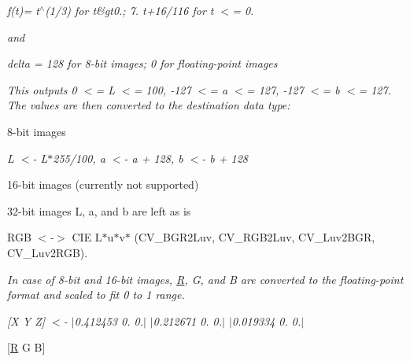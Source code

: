 {\itshape }

{\itshape {\itshape f(t)= t$^\wedge$(1/3) for t\&gt0.; 7. t+16/116 for t $<$= 0.}}

{\itshape }

{\itshape }

{\itshape and}

{\itshape }

{\itshape }

{\itshape {\itshape delta = 128 for 8-\/bit images; 0 for floating-\/point images}}

{\itshape }

{\itshape }

{\itshape This outputs {\itshape 0 $<$= L $<$= 100}, {\itshape -\/127 $<$= a $<$= 127}, {\itshape -\/127 $<$= b $<$= 127}. The values are then converted to the destination data type\+:}

{\itshape  
\begin{DoxyItemize}
\item 8-\/bit images 
\end{DoxyItemize}}

{\itshape }

{\itshape {\itshape L $<$-\/ L$\ast$255/100, a $<$-\/ a + 128, b $<$-\/ b + 128}}

{\itshape }

{\itshape 
\begin{DoxyItemize}
\item 16-\/bit images (currently not supported) 
\item 32-\/bit images L, a, and b are left as is 
\item R\+GB {\itshape $<$-\/$>$} C\+IE L$\ast$u$\ast$v$\ast$ ({\ttfamily C\+V\+\_\+\+B\+G\+R2\+Luv, C\+V\+\_\+\+R\+G\+B2\+Luv, C\+V\+\_\+\+Luv2\+B\+GR, C\+V\+\_\+\+Luv2\+R\+GB}). 
\end{DoxyItemize}}

{\itshape In case of 8-\/bit and 16-\/bit images, \mbox{\hyperlink{classorg_1_1opencv_1_1_r}{R}}, G, and B are converted to the floating-\/point format and scaled to fit 0 to 1 range.}

{\itshape }

{\itshape }

{\itshape {\itshape \mbox{[}X Y Z\mbox{]} $<$-\/ $\vert$0.412453 0. 0.$\vert$ $\vert$0.212671 0. 0.$\vert$ $\vert$0.019334 0. 0.$\vert$}}

{\itshape {\itshape  
\begin{DoxyItemize}
\item \mbox{[}\mbox{\hyperlink{classorg_1_1opencv_1_1_r}{R}} G B\mbox{]}


\end{DoxyItemize}}}

